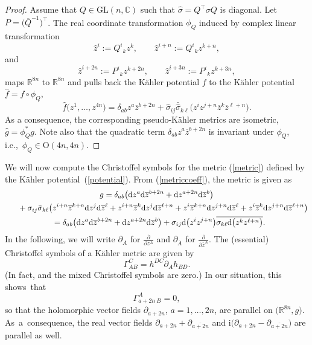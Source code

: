 \documentclass[11pt]{article}
\numberwithin{equation}{section}
\numberwithin{equation}{section}
\newcommand{\C}{\ensuremath{\mathbb{C}}}
\renewcommand{\O}{\ensuremath{\mathrm{O}}}
\newcommand{\GL}{\mathrm{GL}}
\newcommand{\1}{\mathbf{1}}
\renewcommand{\d}{{\mathrm d}}
\newcommand{\ol}{\overline}
\newcommand{\+}{\oplus}
\newcommand{\del}{\partial}
\renewcommand{\=}{\equiv}
\newcommand{\R}{\mathbb{R}}
\begin{document}
\begin{proof}
Assume that $Q\in \GL(n,\C)$ such that $\hat \sigma=Q^\top \sigma Q$ is diagonal. Let $P=\bigl(\overline{Q}^{-1}\bigr)^\top$. The real coordinate transformation $\phi_Q$ induced by complex linear transformation
\[ \hat{z}^{i}:=Q^i{}_k z^{k},\qquad \hat{z}^{i+n}:=Q^i{}_k z^{k+n},\]
and
\[ \hat{z}^{i+2n}:=P^i{}_k z^{k+2n},\qquad {\hat{z}^{i+3n}}:=P^i{}_k z^{k+3n},\]
maps $\R^{8n}$ to $\R^{8n}$ and pulls back the K\"{a}hler potential $f$ to the K\"{a}hler potential $\hat f= f\circ \phi_Q$,
\[
\hat f\bigl({z}^1,\ldots , {z}^{4n}\bigr)
=\delta_{ab} {z}^a\ol{{z}}^{b+2n}+
\hat\sigma_{ij}\bar{\hat\sigma}_{k\ell}
 \bigl(
 {z}^{i}{z}^{j+n}\ol{{z}}^{k} \ol{{z}}^{\ell+n}
 \bigr).
 \]
 As a consequence, the corresponding pseudo-K\"{a}hler metrics are isometric, $\hat g=\phi_Q^*g$. Note also that the quadratic term $\delta_{ab} {z}^a\ol{{z}}^{b+2n}$ is invariant under $\phi_Q$, i.e.,~$\phi_Q\in \O(4n,4n)$.
\end{proof}

We will now compute the Christoffel symbols for the metric (\ref{metric}) defined by the K\"{a}hler potential~(\ref{potential}). From (\ref{metriccoeff}), the metric is given as
\begin{gather}
g =\delta_{ab} \bigl(\d z^a\d \ol{z}^{b+2n} + \d z^{a+2n}\d \ol{z}^{b}\bigr)
\nonumber\\ \hphantom{g=}{}
 +
\sigma_{ij}\bar{\sigma}_{k\ell}
 \bigl(
 z^{i+n}\ol{z}^{k+n}\d z^{j}\d\ol{z}^{\ell}
 +
 z^{i+n}\ol{z}^{k}\d z^{j}\d\ol{z}^{\ell+n}
 +
 z^{i}\ol{z}^{k+n}\d z^{j+n}\d\ol{z}^{\ell}
 +
 z^{i}\ol{z}^{k}\d z^{j+n}\d\ol{z}^{\ell+n}\bigr)
\nonumber\\ \hphantom{g}{}
 =
\delta_{ab} \bigl(\d z^a\d \ol{z}^{b+2n} + \d z^{a+2n}\d \ol{z}^{b}\bigr)
+
 \sigma_{ij} \d\bigl(z^{i} z^{j+n}\bigr)
 \overline{
 \sigma_{k\ell} \d\bigl(z^{k} z^{\ell+n}\bigr)}
.\label{metriclong}
\end{gather}
In the following, we will write $\partial_A$ for $\frac{\partial}{\partial z^A}$ and $\partial_{\overline{A}}$ for $\frac{\partial}{\partial \overline{z}^A}$.
The {(essential)} Christoffel symbols of a K\"{a}hler metric are given by \cite[Section~IX.5]{ko-no2}
\[\Gamma^C_{AB} =h^{DC}\partial_Ah_{BD}.\]
\big(In fact,  and the mixed Christoffel symbols are zero.\big)
In our situation, this shows~that
\[ \Gamma^A_{a+2n\ B}=0,\]
so that the holomorphic vector fields $\del_{a+2n}$, $a=1,\ldots , 2n$, are parallel on $\bigl(\R^{8n}, g\bigr)$. As~a~consequence, the real vector fields
$\del_{a+2n}+\del_{\overline{a+2n}}$ and $\mathrm{i}{\bigl(\del_{a+2n}-\del_{\overline{a+2n}}\bigr)}$ are parallel as well.
\end{document}
